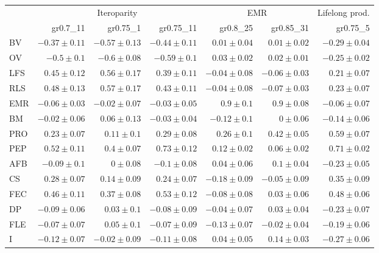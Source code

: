 \begin{landscape}
\begin{table}
\begin{footnotesize}
\begin{tabular}{@{}l|rrr|rr|r@{}}
\toprule
 & \multicolumn{3}{c|}{Iteroparity} & \multicolumn{2}{c|}{EMR} & \multicolumn{1}{c}{Lifelong prod.}\\
 & gr0.7\_11 & gr0.75\_1 & gr0.75\_11 & gr0.8\_25 & gr0.85\_31 & gr0.75\_5\\
\midrule
BV & $-0.37 \pm 0.11$ & $-0.57 \pm 0.13$ & $-0.44 \pm 0.11$ & $0.01 \pm 0.04$ & $0.01 \pm 0.02$ & $-0.29 \pm 0.04$\\
OV & $-0.5 \pm 0.1$ & $-0.6 \pm 0.08$ & $-0.59 \pm 0.1$ & $0.03 \pm 0.02$ & $0.02 \pm 0.01$ & $-0.25 \pm 0.02$\\
LFS & $0.45 \pm 0.12$ & $0.56 \pm 0.17$ & $0.39 \pm 0.11$ & $-0.04 \pm 0.08$ & $-0.06 \pm 0.03$ & $0.21 \pm 0.07$\\
RLS & $0.48 \pm 0.13$ & $0.57 \pm 0.17$ & $0.43 \pm 0.11$ & $-0.04 \pm 0.08$ & $-0.07 \pm 0.03$ & $0.23 \pm 0.07$\\
EMR & $-0.06 \pm 0.03$ & $-0.02 \pm 0.07$ & $-0.03 \pm 0.05$ & $0.9 \pm 0.1$ & $0.9 \pm 0.08$ & $-0.06 \pm 0.07$\\
BM & $-0.02 \pm 0.06$ & $0.06 \pm 0.13$ & $-0.03 \pm 0.04$ & $-0.12 \pm 0.1$ & $0 \pm 0.06$ & $-0.14 \pm 0.06$\\
PRO & $0.23 \pm 0.07$ & $0.11 \pm 0.1$ & $0.29 \pm 0.08$ & $0.26 \pm 0.1$ & $0.42 \pm 0.05$ & $0.59 \pm 0.07$\\
PEP & $0.52 \pm 0.11$ & $0.4 \pm 0.07$ & $0.73 \pm 0.12$ & $0.12 \pm 0.02$ & $0.06 \pm 0.02$ & $0.71 \pm 0.02$\\
AFB & $-0.09 \pm 0.1$ & $0 \pm 0.08$ & $-0.1 \pm 0.08$ & $0.04 \pm 0.06$ & $0.1 \pm 0.04$ & $-0.23 \pm 0.05$\\
CS & $0.28 \pm 0.07$ & $0.14 \pm 0.09$ & $0.24 \pm 0.07$ & $-0.18 \pm 0.09$ & $-0.05 \pm 0.09$ & $0.35 \pm 0.09$\\
FEC & $0.46 \pm 0.11$ & $0.37 \pm 0.08$ & $0.53 \pm 0.12$ & $-0.08 \pm 0.08$ & $0.03 \pm 0.06$ & $0.48 \pm 0.06$\\
DP & $-0.09 \pm 0.06$ & $0.03 \pm 0.1$ & $-0.08 \pm 0.09$ & $-0.04 \pm 0.07$ & $0.03 \pm 0.04$ & $-0.23 \pm 0.07$\\
FLE & $-0.07 \pm 0.07$ & $0.05 \pm 0.1$ & $-0.07 \pm 0.09$ & $-0.13 \pm 0.07$ & $-0.02 \pm 0.04$ & $-0.19 \pm 0.06$\\
I & $-0.12 \pm 0.07$ & $-0.02 \pm 0.09$ & $-0.11 \pm 0.08$ & $0.04 \pm 0.05$ & $0.14 \pm 0.03$ & $-0.27 \pm 0.06$\\
\bottomrule
\end{tabular}


\end{footnotesize}
\end{table}
\end{landscape}
